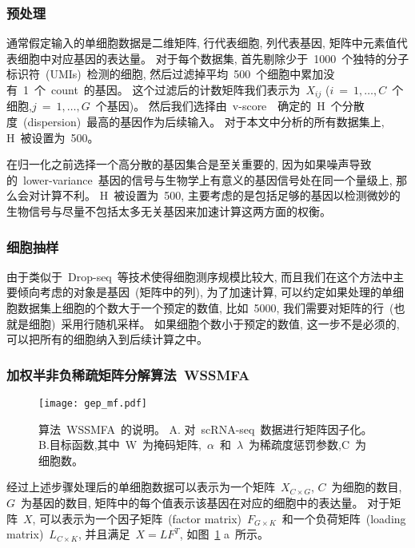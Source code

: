 \subsubsection{预处理}
通常假定输入的单细胞数据是二维矩阵, 行代表细胞, 列代表基因, 矩阵中元素值代表细胞中对应基因的表达量。
对于每个数据集, 首先剔除少于~1000~个独特的分子标识符~(UMIs)~检测的细胞,
然后过滤掉平均~500~个细胞中累加没有~1~个~count~的基因。
这个过滤后的计数矩阵我们表示为~$X_{ij}$ ($i~=~1,\ldots, C$~个细胞,$j~=~1,\ldots, G$~个基因)。
然后我们选择由~v-score~\cite{klein2015droplet}~确定的~H~个分散度~(dispersion)~最高的基因作为后续输入。
对于本文中分析的所有数据集上, H~被设置为~500。

在归一化之前选择一个高分散的基因集合是至关重要的, 
因为如果噪声导致的~lower-variance~基因的信号与生物学上有意义的基因信号处在同一个量级上, 那么会对计算不利。 
H~被设置为~500, 主要考虑的是包括足够的基因以检测微妙的生物信号与尽量不包括太多无关基因来加速计算这两方面的权衡。

\subsubsection{细胞抽样}
由于类似于~Drop-seq~等技术使得细胞测序规模比较大, 而且我们在这个方法中主要倾向考虑的对象是基因~(矩阵中的列), 
为了加速计算, 可以约定如果处理的单细胞数据集上细胞的个数大于一个预定的数值, 比如~5000,
我们需要对矩阵的行~(也就是细胞)~采用行随机采样。
如果细胞个数小于预定的数值, 这一步不是必须的, 可以把所有的细胞纳入到后续计算之中。

\subsubsection{加权半非负稀疏矩阵分解算法~WSSMFA}

\begin{figure}[!htbp]
    \centering
    \texttt{[image: gep\_mf.pdf]}
    \caption{
        算法~WSSMFA~的说明。
        A. 对~scRNA-seq~数据进行矩阵因子化。
        B.目标函数,其中~W~为掩码矩阵,~$\alpha$~和~$\lambda$~为稀疏度惩罚参数,C~为细胞数。
    }
    \label{fig:gep-mf}
\end{figure}

经过上述步骤处理后的单细胞数据可以表示为一个矩阵~$X_{C \times G}$, $C$~为细胞的数目, $G$~为基因的数目, 
矩阵中的每个值表示该基因在对应的细胞中的表达量。
对于矩阵~$X$, 可以表示为一个因子矩阵~(factor matrix)~$F_{G \times K}$~和一个负荷矩阵~(loading matrix)~$L_{C \times K}$,
并且满足~$X=LF^T$, 如图~\ref{fig:gep-mf} a~所示。 

